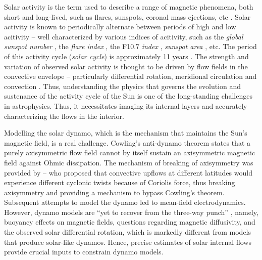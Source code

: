 Solar activity is the term used to describe a range of magnetic phenomena, both short and
long-lived, such as flares, sunspots, coronal mass ejections, etc
\citep{Usoskin-2017-LRSP}. Solar activity is known to periodically
alternate between periods of high and low acitivity --
well characterized by various indices of acitivity, such as
the \emph{global sunspot number} \citep[GSN;][]{Hoyt-1998-SoPh},
the \emph{flare index} \citep{Ozguc-2003-SoPh},
the F10.7 \emph{index} \citep{Tapping-1994-SoPh},
\emph{sunspot area} \citep{Baranyi-2001-MNRAS}, etc. The period
of this activity cycle (\emph{solar cycle}) is approximately 11 years
\citep{Hathaway-2015-LRSP}. The strength and variation of observed solar
activity is thought to be driven by flow fields in the convective
envelope -- particularly differential rotation, meridional circulation
and convection \citep{Charbonneau-2020-LRSP, Fan-2009-LRSP}.
Thus, understanding the physics that governs the evolution
and sustenance of the activity cycle of the Sun is one of the
long-standing challenges in astrophysics. Thus, it necessitates
imaging its internal layers and accurately characterizing the flows in
the interior.

Modelling the solar dynamo, which is the mechanism that
maintains the Sun's magnetic field, is a real challenge.
Cowling's anti-dynamo theorem \citep{Cowling-1934-MNRAS} states that
a purely axisymmetric flow field cannot by itself sustain an
axisymmetric magnetic field against Ohmic dissipation. The mechanism of
breaking of axisymmetry was provided by \cite{Parker-1955-ApJ} -- who proposed
that convective upflows at different latitudes would experience different
cyclonic twists because of Coriolis force, thus breaking axisymmetry and
providing a mechanism to bypass Cowling's theorem. Subsequent attempts to
model the dynamo led to mean-field electrodynamics. However, dynamo
models are ``yet to recover from the three-way punch''
\citep{Charbonneau-2020-LRSP}, namely, buoyancy effects on magnetic fields,
questions regarding magnetic diffusivity, and the observed
solar differential rotation, which is markedly different from models
that produce solar-like dynamos. Hence, precise estimates of solar internal
flows provide crucial inputs to constrain dynamo models.\\


